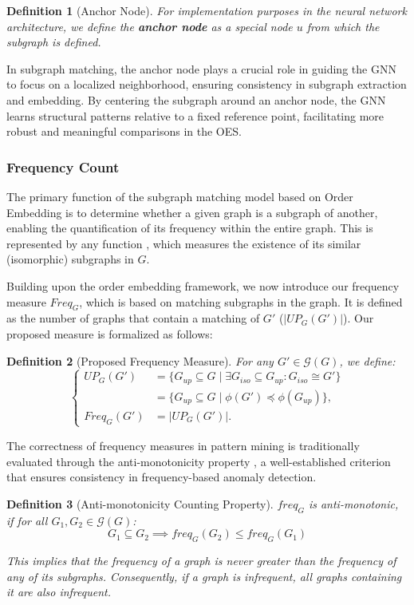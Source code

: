 \documentclass[pdflatex,sn-mathphys-num]{sn-jnl}%
\theoremstyle{thmstyleone}%
\theoremstyle{thmstyletwo}%
\theoremstyle{thmstylethree}%
\newtheorem{definition}{Definition}%
\begin{document}
\begin{definition}[Anchor Node]
For implementation purposes in the neural network architecture, we define the \textbf{anchor node} as a special node $u$ from which the subgraph is defined.
\end{definition}
In subgraph matching, the anchor node plays a crucial role in guiding the GNN to focus on a localized neighborhood, ensuring consistency in subgraph extraction and embedding. By centering the subgraph around an anchor node, the GNN learns structural patterns relative to a fixed reference point, facilitating more robust and meaningful comparisons in the OES.

\subsubsection{Frequency Count}
The primary function of the subgraph matching model based on Order Embedding is to determine whether a given graph is a subgraph of another, enabling the quantification of its frequency within the entire graph. This is represented by any function , which measures the existence of its similar (isomorphic) subgraphs in $G$.

Building upon the order embedding framework, we now introduce our frequency measure \( Freq_G \), which is based on matching subgraphs in the graph. It is defined as the number of graphs that contain a matching of \( G' \) ($|UP_G(G')|$). Our proposed measure is formalized as follows:

\begin{definition}[Proposed Frequency Measure]
For any $G' \in \mathcal{G}(G)$, we define:
\[
\begin{cases}
    UP_G(G') &= \{G_{up} \subseteq G \mid \exists G_{iso} \subseteq G_{up}: G_{iso} \cong G'\} \\
    &= \{G_{up} \subseteq G \mid \phi(G') \preceq \phi(G_{up})\}, \\
    Freq_G(G') &= |UP_G(G')|.
\end{cases}
\]
\end{definition}

The correctness of frequency measures in pattern mining is traditionally evaluated through the anti-monotonicity property \cite{calders2008anti}, a well-established criterion that ensures consistency in frequency-based anomaly detection.

\begin{definition}[Anti-monotonicity Counting Property]
$freq_G$ is anti-monotonic, if for all $G_1, G_2 \in \mathcal{G}(G)$: \[G_1 \subseteq G_2 \implies freq_G(G_2) \le freq_G(G_1)\]

This implies that the frequency of a graph is never greater than the frequency of any of its subgraphs. Consequently, if a graph is infrequent, all graphs containing it are also infrequent.
\end{definition}
\end{document}
